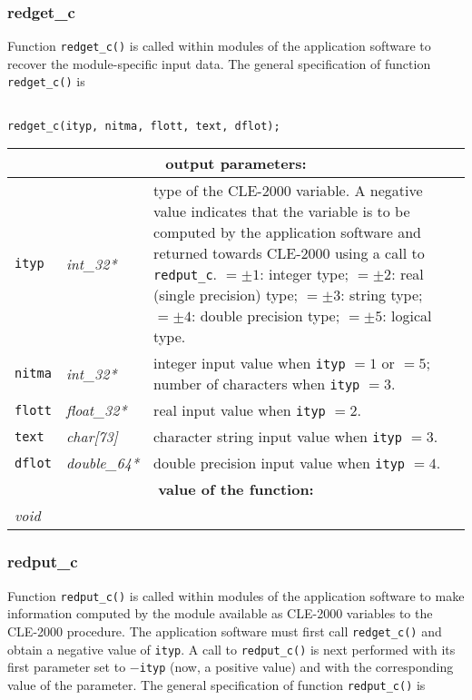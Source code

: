 \subsubsection{redget\_c}

Function {\tt redget\_c()} is called within modules of the application software to recover the module-specific input data.
The general specification of function {\tt redget\_c()} is

\begin{verbatim}

redget_c(ityp, nitma, flott, text, dflot);
\end{verbatim}

\vskip 0.8cm

\noindent
\begin{tabular}{|p{1.5cm}|p{2cm}|p{11cm}|}
\hline
\multicolumn{3}{|c|}{\bf output parameters:} \\
\hline
{\tt ityp} & {\it int\_32*} & type of the CLE-2000 variable. A negative value indicates that the variable is to be computed by the application software and returned towards CLE-2000 using a call to {\tt redput\_c}. $=\pm 1$: integer type;
$=\pm 2$: real (single precision) type;
$=\pm 3$: string type;
$=\pm 4$: double precision type;
$=\pm 5$: logical type.\\
\hline
{\tt nitma} & {\it int\_32*} & integer input value when {\tt ityp} $= 1$ or $= 5$;  number of characters when {\tt ityp} $= 3$. \\
\hline
{\tt flott} & {\it float\_32*} &  real input value when {\tt ityp} $= 2$.  \\
\hline
{\tt text} & {\it char[73]} & character string input value when {\tt ityp} $= 3$.   \\
\hline
{\tt dflot} & {\it double\_64*} & double precision input value when {\tt ityp} $= 4$.   \\
\hline
\multicolumn{3}{|c|}{\bf value of the function:} \\
\hline
\multicolumn{2}{|l|}{\it void}  &  \\
\hline
\end{tabular}

\subsubsection{redput\_c}

Function {\tt redput\_c()} is called within modules of the application software to make information computed by the module available as CLE-2000 variables to the CLE-2000 procedure.
The application software must first call {\tt redget\_c()} and obtain a negative value of {\tt ityp}. A call to {\tt redput\_c()} is next performed with its first parameter set to
$-${\tt ityp} (now, a positive value) and with the corresponding value of the parameter.
The general specification of function {\tt redput\_c()} is

